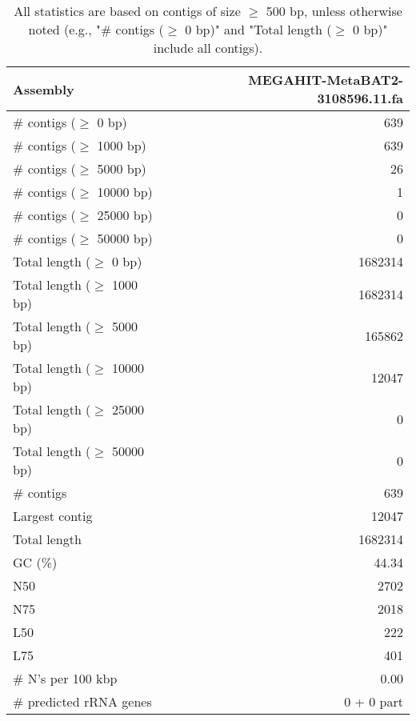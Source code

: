 \documentclass[12pt,a4paper]{article}
\begin{document}
\begin{table}[ht]
\begin{center}
\caption{All statistics are based on contigs of size $\geq$ 500 bp, unless otherwise noted (e.g., "\# contigs ($\geq$ 0 bp)" and "Total length ($\geq$ 0 bp)" include all contigs).}
\begin{tabular}{|l*{1}{|r}|}
\hline
Assembly & MEGAHIT-MetaBAT2-3108596.11.fa \\ \hline
\# contigs ($\geq$ 0 bp) & 639 \\ \hline
\# contigs ($\geq$ 1000 bp) & 639 \\ \hline
\# contigs ($\geq$ 5000 bp) & 26 \\ \hline
\# contigs ($\geq$ 10000 bp) & 1 \\ \hline
\# contigs ($\geq$ 25000 bp) & 0 \\ \hline
\# contigs ($\geq$ 50000 bp) & 0 \\ \hline
Total length ($\geq$ 0 bp) & 1682314 \\ \hline
Total length ($\geq$ 1000 bp) & 1682314 \\ \hline
Total length ($\geq$ 5000 bp) & 165862 \\ \hline
Total length ($\geq$ 10000 bp) & 12047 \\ \hline
Total length ($\geq$ 25000 bp) & 0 \\ \hline
Total length ($\geq$ 50000 bp) & 0 \\ \hline
\# contigs & 639 \\ \hline
Largest contig & 12047 \\ \hline
Total length & 1682314 \\ \hline
GC (\%) & 44.34 \\ \hline
N50 & 2702 \\ \hline
N75 & 2018 \\ \hline
L50 & 222 \\ \hline
L75 & 401 \\ \hline
\# N's per 100 kbp & 0.00 \\ \hline
\# predicted rRNA genes & 0 + 0 part \\ \hline
\end{tabular}
\end{center}
\end{table}
\end{document}
